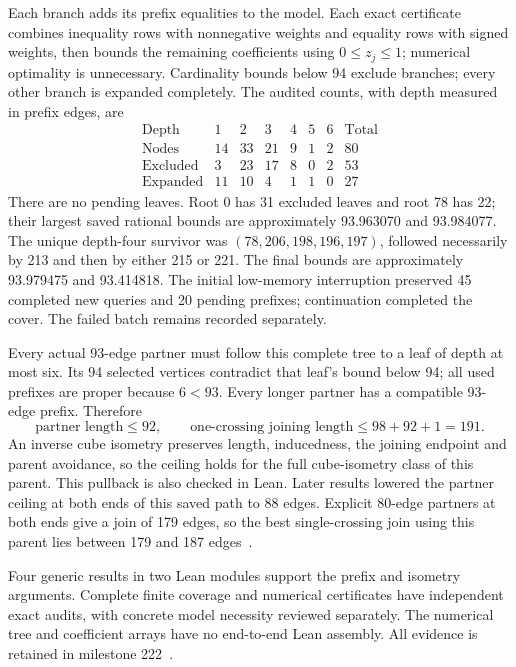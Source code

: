 \documentclass[11pt,a4paper]{article}
\begin{document}
Each branch adds its prefix equalities to the model. Each exact
certificate combines inequality rows with nonnegative weights and equality
rows with signed weights, then bounds the remaining coefficients using
$0\le z_j\le1$; numerical optimality is unnecessary. Cardinality bounds
below 94 exclude branches; every other branch is expanded completely.
The audited counts, with depth measured in prefix edges, are
\[
\begin{array}{c|rrrrrr|r}
\text{Depth}&1&2&3&4&5&6&\text{Total}\\\hline
\text{Nodes}&14&33&21&9&1&2&80\\
\text{Excluded}&3&23&17&8&0&2&53\\
\text{Expanded}&11&10&4&1&1&0&27
\end{array}
\]
There are no pending leaves. Root 0 has 31 excluded leaves and root 78
has 22; their largest saved rational bounds are approximately
93.963070 and 93.984077.
The unique depth-four survivor was $(78,206,198,196,197)$, followed
necessarily by 213 and then by either 215 or 221. The final bounds are approximately
93.979475 and 93.414818. The initial low-memory interruption preserved
45 completed new queries and 20 pending prefixes; continuation completed
the cover. The failed batch remains recorded separately.

Every actual 93-edge partner must follow this complete tree to a leaf
of depth at most six. Its 94 selected vertices contradict that leaf's
bound below 94; all used prefixes are proper because $6<93$.
Every longer partner has a compatible 93-edge prefix. Therefore
\[
\boxed{\text{partner length}\le92,\qquad
\text{one-crossing joining length}\le98+92+1=191.}
\]
An inverse cube isometry preserves length, inducedness, the joining
endpoint and parent avoidance, so the ceiling holds for the full
cube-isometry class of this parent. This pullback is also checked in Lean.
Later results lowered the partner ceiling at both ends of this saved
path to 88 edges. Explicit 80-edge partners at both ends give a
join of 179 edges, so the best single-crossing join using this parent
lies between 179 and 187 edges~\cite{long249}.

Four generic results in two Lean modules support the prefix and isometry
arguments. Complete finite coverage and numerical certificates have
independent exact audits, with concrete model necessity reviewed separately.
The numerical tree and coefficient arrays have no end-to-end Lean assembly.
All evidence is retained in milestone 222~\cite{research222}.
\end{document}
